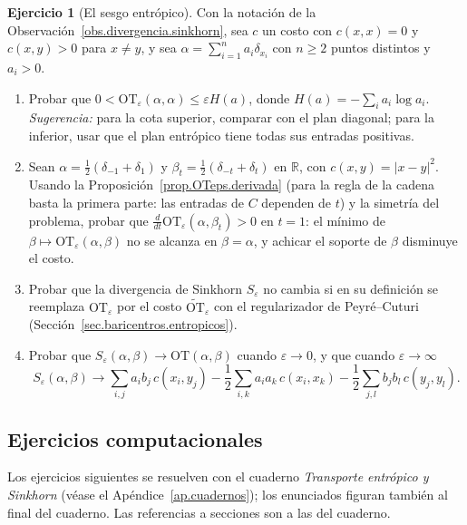 \documentclass[12pt, a4paper]{amsbook}
\newcommand{\ve}{\varepsilon}
\newcommand{\R}{{\mathbb R}}
\theoremstyle{remark}
\theoremstyle{definition}
\newtheorem{ejercicio}{Ejercicio}[chapter]
\numberwithin{section}{chapter}
\numberwithin{subsection}{section}
\numberwithin{equation}{section}
\numberwithin{figure}{chapter}
\begin{document}
\begin{ejercicio}[El sesgo entrópico]\label{ejer.sinkhorn.sesgo}
Con la notación de la Observación~\ref{obs.divergencia.sinkhorn}, sea $c$
un costo con $c(x,x)=0$ y $c(x,y)>0$ para $x\ne y$, y sea
$\alpha=\sum_{i=1}^na_i\delta_{x_i}$ con $n\ge2$ puntos distintos y $a_i>0$.
\begin{enumerate}[label=(\alph*)]
\item Probar que $0<\mathrm{OT}_\ve(\alpha,\alpha)\le\ve H(a)$, donde
$H(a)=-\sum_ia_i\log a_i$. \emph{Sugerencia:} para la cota superior,
comparar con el plan diagonal; para la inferior, usar que el plan entrópico
tiene todas sus entradas positivas.
\item Sean $\alpha=\frac12(\delta_{-1}+\delta_1)$ y
$\beta_t=\frac12(\delta_{-t}+\delta_t)$ en $\R$, con $c(x,y)=|x-y|^2$.
Usando la Proposición~\ref{prop.OTeps.derivada} (para la regla de la
cadena basta la primera parte: las entradas de $C$ dependen de $t$) y la
simetría del problema, probar que
$\frac{d}{dt}\mathrm{OT}_\ve(\alpha,\beta_t)>0$ en $t=1$: el mínimo de
$\beta\mapsto\mathrm{OT}_\ve(\alpha,\beta)$ no se alcanza en $\beta=\alpha$,
y achicar el soporte de $\beta$ disminuye el costo.
\item Probar que la divergencia de Sinkhorn $S_\ve$ no cambia si en su
definición se reemplaza $\mathrm{OT}_\ve$ por el costo
$\widetilde{\mathrm{OT}}_\ve$ con el regularizador de Peyré--Cuturi
(Sección~\ref{sec.baricentros.entropicos}).
\item Probar que $S_\ve(\alpha,\beta)\to\mathrm{OT}(\alpha,\beta)$ cuando
$\ve\to0$, y que cuando $\ve\to\infty$
\[
S_\ve(\alpha,\beta)\to\sum_{i,j}a_ib_j\,c(x_i,y_j)
-\frac12\sum_{i,k}a_ia_k\,c(x_i,x_k)-\frac12\sum_{j,l}b_jb_l\,c(y_j,y_l).
\]
\end{enumerate}
\end{ejercicio}

\subsection*{Ejercicios computacionales}

Los ejercicios siguientes se resuelven con el cuaderno \emph{Transporte
entrópico y Sinkhorn} (véase el Apéndice~\ref{ap.cuadernos}); los enunciados
figuran también al final del cuaderno. Las referencias a secciones son a las
del cuaderno.
\end{document}
